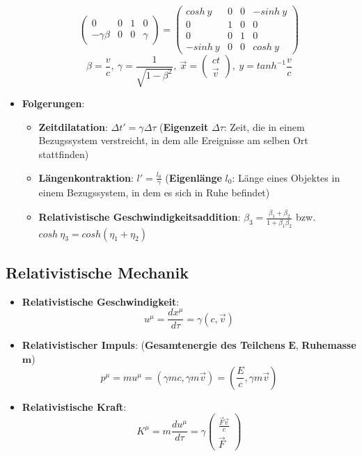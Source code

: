 \begin{itemize}
$$\begin{pmatrix}
			0 & 0 & 1 & 0\\
			-\gamma\beta & 0 & 0 & \gamma
		\end{pmatrix}
		=
		\begin{pmatrix}
			cosh\ y & 0 & 0 & -sinh\ y\\
			0 & 1 & 0 & 0\\
			0 & 0 & 1 & 0\\
			-sinh\ y & 0 & 0 & cosh\ y
		\end{pmatrix}
	$$
	$$
			\beta = \frac{v}{c},\ \gamma = \frac{1}{\sqrt{1 - \beta^2}},\ \vec{x} = \begin{pmatrix}ct\\\vec{v}\end{pmatrix},\ y = tanh^{-1}\frac{v}{c}
	$$
	\item \textbf{Folgerungen}:
	\begin{itemize}
		\item \textbf{Zeitdilatation}: $\Delta t' = \gamma\Delta\tau$ (\textbf{Eigenzeit} $\Delta\tau$: Zeit, die in einem Bezugssystem verstreicht, in dem alle Ereignisse am selben Ort stattfinden)
		\item \textbf{Längenkontraktion}: $l' = \frac{l_0}{\gamma}$ (\textbf{Eigenlänge} $l_0$: Länge eines Objektes in einem Bezugssystem, in dem es sich in Ruhe befindet)
		\item \textbf{Relativistische Geschwindigkeitsaddition}: $\beta_3 = \frac{\beta_1 + \beta_2}{1 + \beta_1\beta_2}$ bzw. $cosh\ \eta_3 = cosh(\eta_1 + \eta_2)$
	\end{itemize}
\end{itemize}

\subsection{Relativistische Mechanik}%
\label{srel:sub:relativistische_mechanik}

\begin{itemize}
	\item \textbf{Relativistische Geschwindigkeit}: $$u^\mu = \frac{dx^\mu}{d\tau} = \gamma(c, \vec{v})$$
	\item \textbf{Relativistischer Impuls}: (\textbf{Gesamtenergie des Teilchens} $\mathbf{E}$, \textbf{Ruhemasse} $\mathbf{m}$) $$p^\mu = mu^\mu = (\gamma m c, \gamma m \vec{v}) = (\frac{E}{c}, \gamma m \vec{v})$$
	\item \textbf{Relativistische Kraft}: $$K^\mu = m\frac{du^\mu}{d\tau} = \gamma \begin{pmatrix}\frac{\vec{F}\vec{v}}{c}\\\vec{F}\end{pmatrix}$$
\end{itemize}